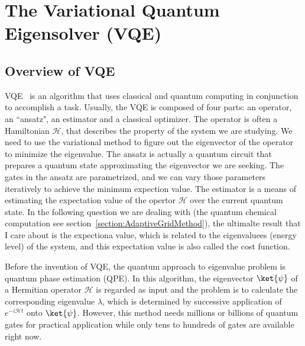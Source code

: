 \section{The Variational Quantum Eigensolver (VQE)}
\subsection{Overview of VQE}
VQE~\cite{IBMQuantumVQE, Abhijith2018QuantumBeginner, Peruzzo2014VQE} is an algorithm that uses classical and quantum computing in conjunction to accomplish a task.  Usually, the VQE is composed of four parts: an operator, an ``ansatz", an estimator and a classical optimizer. The operator is often a Hamiltonian $\mathcal{H}$, that describes the property of the system we are studying. We need to use the variational method to figure out the eigenvector of the operator to minimize the eigenvalue. The ansatz is actually a quantum circuit that prepares a quantum state approximating the eigenvector we are seeking. The gates in the ansatz are parametrized, and we can vary those parameters iteratively to achieve the minimum expection value. The estimator is a means of estimating the expectation value of the opertor $\mathcal{H}$ over the current quantum state. In the following question we are dealing with (the quantum chemical computation see section~\ref{section:AdaptiveGridMethod}),  the ultimalte result that I care about is the expectiona value, which is related to the eigenvaluees (energy level) of the system, and this expectation value is also called the cost function.   

Before the invention of VQE, the quantum approach to eigenvalue problem is quantum phase estimation (QPE). In this algorithm, the eigenvector $\ket{\psi}$ of a Hermitian operator $\mathcal{H}$ is regarded as input and the problem is to calculate the corresponding eigenvalue $\lambda$, which is determined by successive application of $e^{-i\mathcal{H}t}$ onto $\ket{\psi}$. However, this method needs millions or billions of quantum gates for practical application while only tens to hundreds of gates are available right now. 


